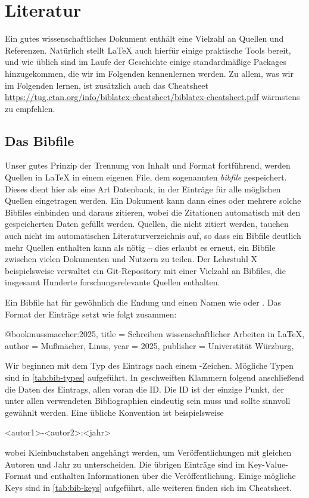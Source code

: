 \chapter{Literatur}

Ein gutes wissenschaftliches Dokument enthält eine Vielzahl an Quellen und Referenzen.
Natürlich stellt \LaTeX{} auch hierfür einige praktische Tools bereit, und wie üblich sind im Laufe der Geschichte einige standardmäßige Packages hinzugekommen, die wir im Folgenden kennenlernen werden.
Zu allem, was wir im Folgenden lernen, ist zusätzlich auch das Cheatsheet \url{https://tug.ctan.org/info/biblatex-cheatsheet/biblatex-cheatsheet.pdf} wärmstens zu empfehlen.

\section{Das Bibfile}
Unser gutes Prinzip der Trennung von Inhalt und Format fortführend, werden Quellen in \LaTeX{} in einem eigenen File, dem sogenannten \emph{bibfile} gespeichert.
Dieses dient hier als eine Art Datenbank, in der Einträge für alle möglichen Quellen eingetragen werden.
Ein Dokument kann dann eines oder mehrere solche Bibfiles einbinden und daraus zitieren, wobei die Zitationen automatisch mit den gespeicherten Daten gefüllt werden.
Quellen, die nicht zitiert werden, tauchen auch nicht im automatischen Literaturverzeichnis auf, so dass ein Bibfile deutlich mehr Quellen enthalten kann als nötig -- dies erlaubt es erneut, ein Bibfile zwischen vielen Dokumenten und Nutzern zu teilen.
Der Lehrstuhl X beispielsweise verwaltet ein Git-Repository mit einer Vielzahl an Bibfiles, die insgesamt Hunderte forschungsrelevante Quellen enthalten.

Ein Bibfile hat für gewöhnlich die Endung  und einen Namen wie  oder .
Das Format der Einträge setzt wie folgt zusammen:
\begin{latexlisting}
	@book{mussmaecher:2025,
		title = {Schreiben wissenschaftlicher Arbeiten in LaTeX},
		author = {Mußmächer, Linus},
		year = {2025},
		publisher = {Universtität Würzburg},
	}
\end{latexlisting}
Wir beginnen mit dem Typ des Eintrags nach einem \key{\@}-Zeichen.
Mögliche Typen sind in \autoref{tab:bib-types} aufgeführt.
In geschweiften Klammern folgend anschließend die Daten des Eintrags, allen voran die ID.
Die ID ist der einzige Punkt, der unter allen verwendeten Bibliographien eindeutig sein muss und sollte sinnvoll gewähnlt werden.
Eine übliche Konvention ist beispielsweise
\begin{latexlisting}
	<autor1>-<autor2>:<jahr>
\end{latexlisting}
wobei Kleinbuchstaben angehängt werden, um Veröffentlichungen mit gleichen Autoren und Jahr zu unterscheiden.
Die übrigen Einträge sind im Key-Value-Format und enthalten Informationen über die Veröffentlichung.
Einige mögliche Keys sind in \autoref{tab:bib-keys} aufgeführt, alle weiteren finden sich im Cheatsheet.

